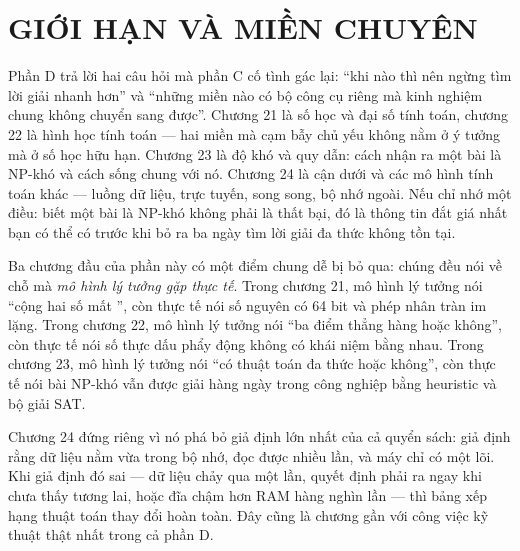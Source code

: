 \documentclass[../algorithm.tex]{subfiles}
\begin{document}
\part{GIỚI HẠN VÀ MIỀN CHUYÊN}
\begin{tomtat}
Phần D trả lời hai câu hỏi mà phần C cố tình gác lại: ``khi nào thì nên ngừng tìm lời giải nhanh hơn'' và ``những miền nào có bộ công cụ riêng mà kinh nghiệm chung không chuyển sang được''. Chương 21 là số học và đại số tính toán, chương 22 là hình học tính toán --- hai miền mà cạm bẫy chủ yếu không nằm ở ý tưởng mà ở số học hữu hạn. Chương 23 là độ khó và quy dẫn: cách nhận ra một bài là NP-khó và cách sống chung với nó. Chương 24 là cận dưới và các mô hình tính toán khác --- luồng dữ liệu, trực tuyến, song song, bộ nhớ ngoài. Nếu chỉ nhớ một điều: biết một bài là NP-khó không phải là thất bại, đó là thông tin đắt giá nhất bạn có thể có trước khi bỏ ra ba ngày tìm lời giải đa thức không tồn tại.
\end{tomtat}

Ba chương đầu của phần này có một điểm chung dễ bị bỏ qua: chúng đều nói về chỗ mà \emph{mô hình lý tưởng gặp thực tế}. Trong chương 21, mô hình lý tưởng nói ``cộng hai số mất '', còn thực tế nói số nguyên có 64 bit và phép nhân tràn im lặng. Trong chương 22, mô hình lý tưởng nói ``ba điểm thẳng hàng hoặc không'', còn thực tế nói số thực dấu phẩy động không có khái niệm bằng nhau. Trong chương 23, mô hình lý tưởng nói ``có thuật toán đa thức hoặc không'', còn thực tế nói bài NP-khó vẫn được giải hàng ngày trong công nghiệp bằng heuristic và bộ giải SAT.

Chương 24 đứng riêng vì nó phá bỏ giả định lớn nhất của cả quyển sách: giả định rằng dữ liệu nằm vừa trong bộ nhớ, đọc được nhiều lần, và máy chỉ có một lõi. Khi giả định đó sai --- dữ liệu chảy qua một lần, quyết định phải ra ngay khi chưa thấy tương lai, hoặc đĩa chậm hơn RAM hàng nghìn lần --- thì bảng xếp hạng thuật toán thay đổi hoàn toàn. Đây cũng là chương gần với công việc kỹ thuật thật nhất trong cả phần D.





\ifSubfilesClassLoaded{\printbibliography[title={Nguồn}]}{}
\end{document}
